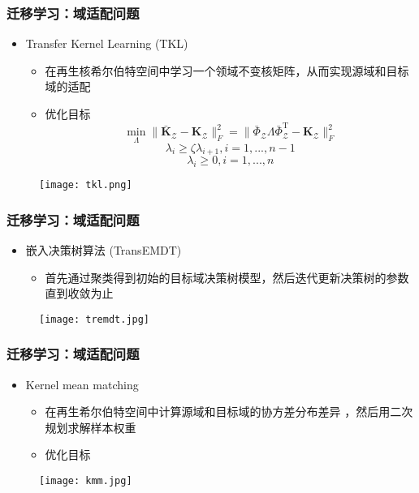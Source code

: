 \begin{frame}
    \frametitle{迁移学习：域适配问题}
    \begin{itemize}
        \item Transfer Kernel Learning (TKL) 
            \begin{itemize}
                \item 在再生核希尔伯特空间中学习一个领域不变核矩阵，从而实现源域和目标域的适配
                \item 优化目标
                $$\min_{\Lambda} \lVert \bar{\mathbf{K}}_{\mathcal Z} - \mathbf{K}_{\mathcal Z} \rVert^2_F = \lVert \bar{\Phi}_{\mathcal{Z}} \Lambda
\bar{\Phi}_{\mathcal{Z}}^{\text{T}}- \mathbf{K}_{\mathcal Z} \rVert ^2_F $$
                $$\lambda_i \geq \zeta\lambda_{i+1}, i=1,...,n-1$$
                $$\lambda_i \geq 0, i=1,...,n$$
            \end{itemize}
    \end{itemize}
    \begin{figure}
        \texttt{[image: tkl.png]}
    \end{figure}
\end{frame}

\begin{frame}
    \frametitle{迁移学习：域适配问题}
    \begin{itemize}
        \item 嵌入决策树算法 (TransEMDT) 
            \begin{itemize}
                \item 首先通过聚类得到初始的目标域决策树模型，然后迭代更新决策树的参数直到收敛为止
            \end{itemize}
    \end{itemize}
    \begin{figure}
        \texttt{[image: tremdt.jpg]}
    \end{figure}
\end{frame}

\begin{frame}
    \frametitle{迁移学习：域适配问题}
    \begin{itemize}
        \item Kernel mean matching 
            \begin{itemize}
                \item 在再生希尔伯特空间中计算源域和目标域的协方差分布差异 ，然后用二次规划求解样本权重
                \item 优化目标
            \end{itemize}
    \end{itemize}
    \begin{figure}
        \texttt{[image: kmm.jpg]}
    \end{figure}
\end{frame}

